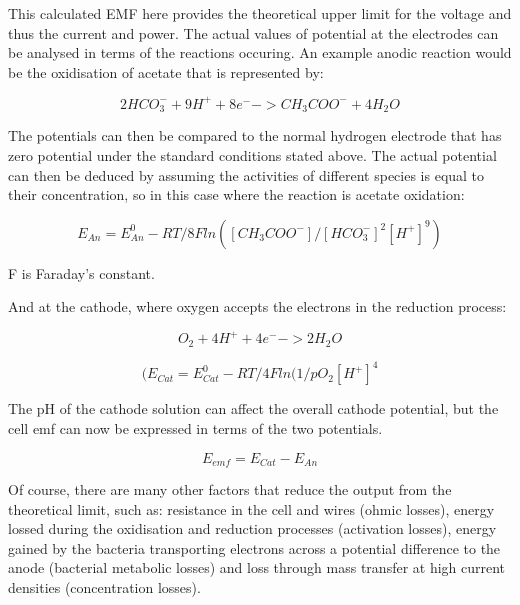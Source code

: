 \documentclass[12pt]{article}
\begin{document}
This calculated EMF here provides the theoretical upper limit for the voltage and thus the current and power. The actual values of potential at the electrodes can be analysed in terms of the reactions occuring. An example anodic reaction would be the oxidisation of acetate that is represented by:

\begin{equation}
2HCO_{3}^{-} + 9H^{+} + 8e^{-} -> CH_{3}COO^{-} + 4H_{2}O
\end{equation}


The potentials can then be compared to the normal hydrogen electrode that has zero potential under the standard conditions stated above. The actual potential can then be deduced by assuming the activities of different species is equal to their concentration, so in this case where the reaction is acetate oxidation:

\begin{equation}
E_{An} = E_{An}^{0}  - RT / 8F ln ([CH_{3}COO^{-}]/[HCO_{3}^{-}]^{2} [H^{+}]^{9{}})
\end{equation}

F is Faraday's constant.

And at the cathode, where oxygen accepts the electrons in the reduction process:

\begin{equation}
O_{2} + 4H^{+} + 4e^{-} -> 2 H_{2} O
\end{equation}


\begin{equation}
(E_{Cat} = E_{Cat} ^ {0} - RT/4F ln(1/ p O_{2} [H^{+}]^{4}
\end{equation}


The pH of the cathode solution can affect the overall cathode potential, but the cell emf can now be expressed in terms of the two potentials.\cite{logan2006microbial}

\begin{equation}
E_{emf} = E_{Cat} - E_{An}
\end{equation}
 
Of course, there are many other factors that reduce the output from the theoretical limit, such as: resistance in the cell and wires (ohmic losses), energy lossed during the oxidisation and reduction processes (activation losses), energy gained by the bacteria transporting electrons across a potential difference to the anode (bacterial metabolic losses) and loss through mass transfer at high current densities (concentration losses).\cite{logan2006microbial}
\end{document}
